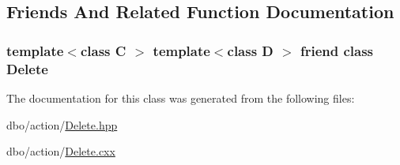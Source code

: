 \subsection{Friends And Related Function Documentation}
\hypertarget{classdbo_1_1action_1_1_delete_a86bcfdc8a57bb29053c4150ab69352a8}{
\subsubsection[{Delete}]{\setlength{\rightskip}{0pt plus 5cm}template$<$class C $>$ template$<$class D $>$ friend class {\bf Delete}\hspace{0.3cm}{\ttfamily [friend]}}}\label{classdbo_1_1action_1_1_delete_a86bcfdc8a57bb29053c4150ab69352a8}


The documentation for this class was generated from the following files\+:\begin{DoxyCompactItemize}
\item 
dbo/action/\hyperlink{_delete_8hpp}{Delete.\+hpp}\item 
dbo/action/\hyperlink{_delete_8cxx}{Delete.\+cxx}\end{DoxyCompactItemize}
